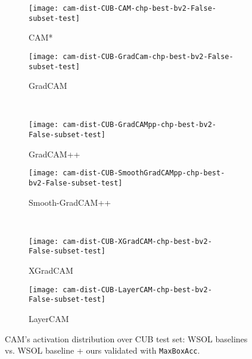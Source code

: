 \documentclass[twocolumn]{article}
\newcommand\maxboxacc{\texttt{MaxBoxAcc}\xspace}
\theoremstyle{definition}
\begin{document}
\FloatBarrier

\begin{figure*}
     \centering
     \begin{subfigure}[b]{0.49\textwidth}
         \centering
         \texttt{[image: cam-dist-CUB-CAM-chp-best-bv2-False-subset-test]}
         \caption{CAM*}
         \label{fig:dist6cub}
     \end{subfigure}
     \hfill
     \begin{subfigure}[b]{0.49\textwidth}
         \centering
         \texttt{[image: cam-dist-CUB-GradCam-chp-best-bv2-False-subset-test]}
         \caption{GradCAM}
         \label{fig:dist5cub}
     \end{subfigure}
     \\
     \begin{subfigure}[b]{0.49\textwidth}
         \centering
         \texttt{[image: cam-dist-CUB-GradCAMpp-chp-best-bv2-False-subset-test]}
         \caption{GradCAM++}
         \label{fig:dist4cub}
     \end{subfigure}
     \begin{subfigure}[b]{0.49\textwidth}
         \centering
         \texttt{[image: cam-dist-CUB-SmoothGradCAMpp-chp-best-bv2-False-subset-test]}
         \caption{Smooth-GradCAM++}
         \label{fig:dist3cub}
     \end{subfigure}
     \\
     \begin{subfigure}[b]{0.49\textwidth}
         \centering
         \texttt{[image: cam-dist-CUB-XGradCAM-chp-best-bv2-False-subset-test]}
         \caption{XGradCAM}
         \label{fig:dist2cub}
     \end{subfigure}
     \hfill
     \begin{subfigure}[b]{0.49\textwidth}
         \centering
         \texttt{[image: cam-dist-CUB-LayerCAM-chp-best-bv2-False-subset-test]}
         \caption{LayerCAM}
         \label{fig:dist1cub}
     \end{subfigure}
        \caption{CAM's activation distribution over CUB test set: WSOL baselines vs. WSOL baseline + ours  validated with \maxboxacc.}
        \label{fig:cub-cam-dist}
\end{figure*}
\end{document}
